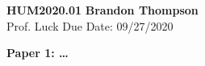 \noindent
\textbf{HUM2020.01} \hfill \textbf{Brandon Thompson} \\
\normalsize Prof. Luck \hfill Due Date: 09/27/2020 \\

\begin{center}
\textbf{Paper 1: \dots}
\end{center}
